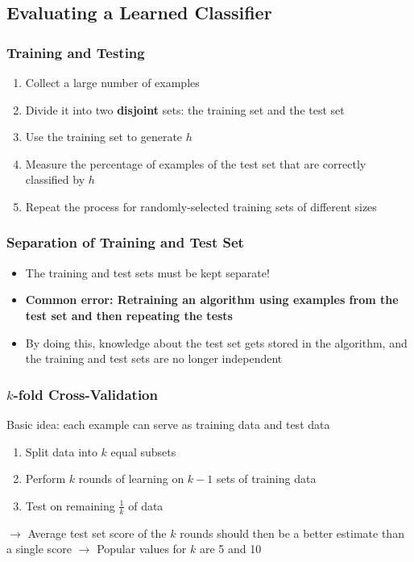 \documentclass[conference, a4paper]{styles/acmsiggraph}
\begin{document}
        
    \subsection{Evaluating a Learned Classifier}
    
        \subsubsection{Training and Testing}
            \begin{enumerate}
                \item Collect a large number of examples
                \item Divide it into two \textbf{disjoint} sets: the training set and the test set
                \item Use the training set to generate $h$
                \item Measure the percentage of examples of the test set that are correctly classified by $h$
                \item Repeat the process for randomly-selected training sets of different sizes
            \end{enumerate}
        
        \subsubsection{Separation of Training and Test Set}
            \begin{itemize}
                \item The training and test sets must be kept separate!
                \item \textbf{Common error: Retraining an algorithm using examples from the test set and then repeating the tests}
                \item By doing this, knowledge about the test set gets stored in the algorithm, and the training and test sets are no longer independent
            \end{itemize}

\newpage

        \subsubsection{$k$-fold Cross-Validation}
            Basic idea: each example can serve as training data and test data
            \begin{enumerate}
                \item Split data into $k$ equal subsets
                \item Perform $k$ rounds of learning on $k-1$ sets of training data
                \item Test on remaining $\frac{1}{k}$ of data
            \end{enumerate}
            $\rightarrow$ Average test set score of the $k$ rounds should then be a better estimate than a single score\newline
            $\rightarrow$ Popular values for $k$ are 5 and 10
        
\end{document}
